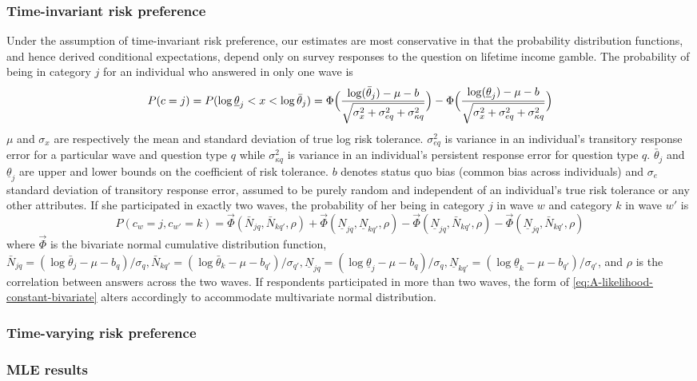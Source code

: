 \documentclass[]{article}
\begin{document}
\subsubsection{Time-invariant risk preference}
Under the assumption of time-invariant risk preference, our estimates are most conservative in that the probability distribution functions, and hence derived conditional expectations, depend only on survey responses to the question on lifetime income gamble. The probability of being in category $j$ for an individual who answered in only one wave is 
\begin{equation}
P(c=j)=P(\log\underline{\theta}_j<x<\log\bar{\theta}_j)=\Phi\Big({\log(\bar{\theta}_j)-\mu-b\over\sqrt{\sigma_x^2+\sigma_{eq}^2+\sigma_{\kappa q}^2}}\Big)-\Phi\Big({\log(\underline{\theta}_j)-\mu-b\over\sqrt{\sigma_x^2+\sigma_{eq}^2+\sigma_{\kappa q}^2}}\Big) 
\label{eq:A-likelihood-constant-univariate}	
\end{equation}
$\mu$ and $\sigma_x$ are respectively the mean and standard deviation of true log risk tolerance. $\sigma_{eq}^2$ is variance in an individual's transitory response error for a particular wave and question type $q$ while $\sigma_{\kappa q}^2$ is variance in an individual's persistent response error for question type $q$. $\bar \theta_j$ and $\underline{\theta}_j$ are upper and lower bounds on the coefficient of risk tolerance. $b$ denotes status quo bias (common bias across individuals) and $\sigma_e$ standard deviation of transitory response error, assumed to be purely random and independent of an individual's true risk tolerance or any other attributes. If she participated in exactly two waves, the probability of her being in category $j$ in wave $w$ and category $k$ in wave $w'$ is
\begin{equation}
P(c_w=j, c_{w'}=k)=\vec{\Phi}(\bar N_{jq}, \bar N_{kq'},\rho)+\vec{\Phi}(\underline N_{jq}, \underline N_{kq'},\rho)-\vec{\Phi}(\underline N_{jq}, \bar N_{kq'},\rho)-\vec{\Phi}(\underline N_{jq}, \bar N_{kq'},\rho)
\label{eq:A-likelihood-constant-bivariate}
\end{equation}
where $\vec{\Phi}$ is the bivariate normal cumulative distribution function, $\bar N_{jq}=(\log \bar \theta_j-\mu-b_q)/\sigma_q,\bar N_{kq'}=(\log \bar \theta_k-\mu-b_{q'})/\sigma_{q'}, \underline N_{jq}=(\log \underline \theta_j-\mu-b_q)/\sigma_q, \underline N_{kq'}=(\log \underline \theta_k-\mu-b_{q'})/\sigma_{q'}$, and $\rho$ is the correlation between answers across the two waves. If respondents participated in more than two waves, the form of \eqref{eq:A-likelihood-constant-bivariate} alters accordingly to accommodate multivariate normal distribution.

\subsubsection{Time-varying risk preference}



\subsubsection{MLE results}
\end{document}

